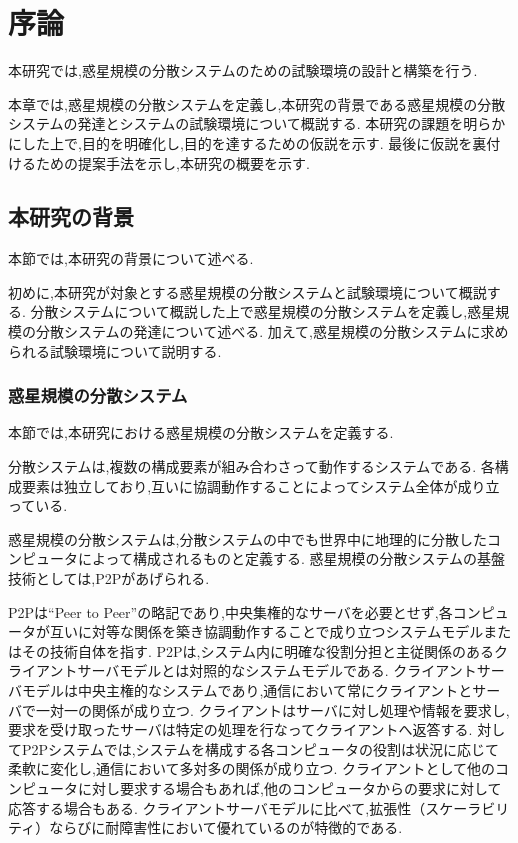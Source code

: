 \chapter{序論}
\label{introduction}

本研究では,惑星規模の分散システムのための試験環境の設計と構築を行う.

本章では,惑星規模の分散システムを定義し,本研究の背景である惑星規模の分散システムの発達とシステムの試験環境について概説する.
本研究の課題を明らかにした上で,目的を明確化し,目的を達するための仮説を示す.
最後に仮説を裏付けるための提案手法を示し,本研究の概要を示す.

\section{本研究の背景}
\label{introduction:background}

本節では,本研究の背景について述べる.

初めに,本研究が対象とする惑星規模の分散システムと試験環境について概説する.
分散システムについて概説した上で惑星規模の分散システムを定義し,惑星規模の分散システムの発達について述べる.
加えて,惑星規模の分散システムに求められる試験環境について説明する.

\subsection{惑星規模の分散システム}

本節では,本研究における惑星規模の分散システムを定義する.

分散システムは,複数の構成要素が組み合わさって動作するシステムである.
各構成要素は独立しており,互いに協調動作することによってシステム全体が成り立っている.

惑星規模の分散システムは,分散システムの中でも世界中に地理的に分散したコンピュータによって構成されるものと定義する.
惑星規模の分散システムの基盤技術としては,P2Pがあげられる.

P2Pは``Peer to Peer''の略記であり,中央集権的なサーバを必要とせず,各コンピュータが互いに対等な関係を築き協調動作することで成り立つシステムモデルまたはその技術自体を指す.
P2Pは,システム内に明確な役割分担と主従関係のあるクライアントサーバモデルとは対照的なシステムモデルである.
クライアントサーバモデルは中央主権的なシステムであり,通信において常にクライアントとサーバで一対一の関係が成り立つ.
クライアントはサーバに対し処理や情報を要求し,要求を受け取ったサーバは特定の処理を行なってクライアントへ返答する.
対してP2Pシステムでは,システムを構成する各コンピュータの役割は状況に応じて柔軟に変化し,通信において多対多の関係が成り立つ.
クライアントとして他のコンピュータに対し要求する場合もあれば,他のコンピュータからの要求に対して応答する場合もある.
クライアントサーバモデルに比べて,拡張性（スケーラビリティ）ならびに耐障害性において優れているのが特徴的である.

